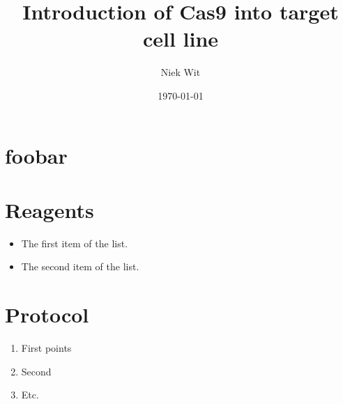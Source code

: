 \documentclass{article}
\title{Introduction of Cas9 into target cell line}
\date{\today}
\author{Niek Wit}
\begin{document}
    
    
    \section{foobar}

    \maketitle

    \section{Reagents}
    
    \begin{itemize}
        \item The first item of the list.
        \item The second item of the list.
    \end{itemize}


    \section{Protocol}

    \begin{enumerate}
        \item First points
        \item Second
        \item Etc.
      \end{enumerate}
\end{document}
